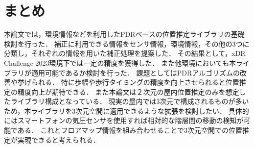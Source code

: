 

\section{まとめ}
本論文では，環境情報などを利用したPDRベースの位置推定ライブラリの基礎検討を行った．
補正に利用できる情報をセンサ情報，環境情報，その他の3つに分類し，それぞれの情報を用いた補正処理を提案した．
その結果として，xDR Challenge 2023環境下では一定の精度を獲得した．
また他環境においても本ライブラリが適用可能であるか検討を行った．
課題としてはPDRアルゴリズムの改善や挙げられる．
特に歩幅や歩行タイミングの精度を向上させられると位置推定の精度向上が期待できる．
また本論文は２次元の屋内位置推定のみを想定したライブラリ構成となっている．
現実の屋内では3次元で構成されるものが多いため，本ライブラリを3次元空間に適用できるような拡張を検討したい．
具体的にはスマートフォンの気圧センサを使用すれば相対的な階層間の移動の検知が可能である．
これとフロアマップ情報を組み合わせることで3次元空間での位置推定が実現できると考えられる．

